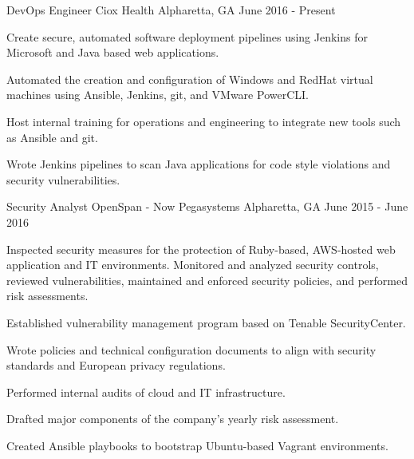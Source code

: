 


\begin{cventries}


\cventry
{DevOps Engineer}
{Ciox Health}
{Alpharetta, GA}
{June 2016 - Present}
{ %
Create secure, automated software deployment pipelines using Jenkins for Microsoft and Java based web applications.
\begin{cvitems}
\item[]
\item {Automated the creation and configuration of Windows and RedHat virtual machines using Ansible, Jenkins, git, and VMware PowerCLI.}
\item {Host internal training for operations and engineering to integrate new tools such as Ansible and git.}
\item {Wrote Jenkins pipelines to scan Java applications for code style violations and security vulnerabilities.}
\end{cvitems}
}


\cventry
{Security Analyst}
{OpenSpan - Now Pegasystems}
{Alpharetta, GA}
{June 2015 - June 2016}
{ %
Inspected security measures for the protection of Ruby-based, AWS-hosted web application and IT environments. Monitored and analyzed security controls, reviewed vulnerabilities, maintained and enforced security policies, and performed risk assessments.
\begin{cvitems}
\item[]
\item {Established vulnerability management program based on Tenable SecurityCenter.}
\item {Wrote policies and technical configuration documents to align with security standards and European privacy regulations.}
\item {Performed internal audits of cloud and IT infrastructure.}
\item {Drafted major components of the company's yearly risk assessment.}
\item {Created Ansible playbooks to bootstrap Ubuntu-based Vagrant environments.}
\end{cvitems}
}


\end{cventries}
